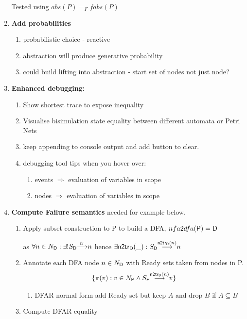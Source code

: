 \documentclass[]{article}
\begin{document}
\begin{enumerate}
Tested using $abs(P) =_F fabs(P)$

\item {\bf Add probabilities}
\begin{enumerate}
\item probabilistic choice - reactive
\item abstraction will produce generative probability
\item could build  lifting into abstraction - start set of nodes  not just node?
\end{enumerate}
\item {\bf Enhanced  debugging:}
 \begin{enumerate}
 \item Show shortest trace to expose inequality
  \item Visualise bisimulation  state equality between different automata or Petri Nets
 \item  keep appending to console output and add button to clear.
\item debugging tool tips when you hover over:
 \begin{enumerate}
 \item events $\Rightarrow$ evaluation of variables in scope 
 \item  nodes $\Rightarrow$ evaluation of variables in scope 
 \end{enumerate}
 
 \end{enumerate} 

\item {\bf Compute Failure semantics} needed for example below.

\begin{enumerate}
\item Apply subset construction to {\sf P} to build a DFA,  $nfa2dfa({\sf P}) = {\sf D}$

\begin{center}as $\forall n\in N_{\sf D} : \exists ! {S_{\sf D}}{\stackrel{tr}{\longrightarrow}}{n}  $ hence $\exists {\sf n2tr_D}(\_) :   {S_{\sf D}}{\stackrel{{\sf n2tr_D}(n)}{\longrightarrow}}{n}  $
\end{center}
\item Annotate each DFA  node $n\in N_{\sf D}$ with Ready sets taken from nodes in {\sf P}.
\[\{\pi(v) : v\in N_{\sf P} \land {S_{\sf P}}{\stackrel{{\sf n2tr_D}(n)}{\longrightarrow}}{v} \}\]
\begin{enumerate}
\item DFAR normal form add Ready set but keep $A$ and drop $B$ if $A\subseteq B$
\end{enumerate}
\item Compute  DFAR equality
\end{enumerate}


\end{enumerate}
\end{document}
